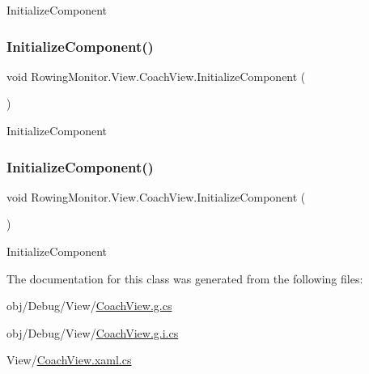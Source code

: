 Initialize\+Component 

\mbox{\label{class_rowing_monitor_1_1_view_1_1_coach_view_a4751c9ab7f066dceb54766893a536101}} 
\subsubsection{\texorpdfstring{Initialize\+Component()}{InitializeComponent()}\hspace{0.1cm}{\footnotesize\ttfamily [3/4]}}
{\footnotesize\ttfamily void Rowing\+Monitor.\+View.\+Coach\+View.\+Initialize\+Component (\begin{DoxyParamCaption}{ }\end{DoxyParamCaption})}



Initialize\+Component 

\mbox{\label{class_rowing_monitor_1_1_view_1_1_coach_view_a4751c9ab7f066dceb54766893a536101}} 
\subsubsection{\texorpdfstring{Initialize\+Component()}{InitializeComponent()}\hspace{0.1cm}{\footnotesize\ttfamily [4/4]}}
{\footnotesize\ttfamily void Rowing\+Monitor.\+View.\+Coach\+View.\+Initialize\+Component (\begin{DoxyParamCaption}{ }\end{DoxyParamCaption})}



Initialize\+Component 



The documentation for this class was generated from the following files\+:\begin{DoxyCompactItemize}
\item 
obj/\+Debug/\+View/\hyperlink{_debug_2_view_2_coach_view_8g_8cs}{Coach\+View.\+g.\+cs}\item 
obj/\+Debug/\+View/\hyperlink{_debug_2_view_2_coach_view_8g_8i_8cs}{Coach\+View.\+g.\+i.\+cs}\item 
View/\hyperlink{_coach_view_8xaml_8cs}{Coach\+View.\+xaml.\+cs}\end{DoxyCompactItemize}
